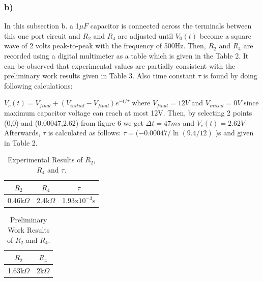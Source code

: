 \documentclass[letterpaper,12pt]{article}
\begin{document}
\subsubsection{b)}
In this subsection b. a 1\(\mu F\) capacitor is connected across the terminals between this one port circuit and \(R_2 \) and \(R_4 \) are adjusted until \(V_0(t)\) become a square wave of 2 volts peak-to-peak with the frequency of 500Hz. Then, \(R_2 \) and \(R_4 \) are recorded using a digital multimeter as a table which is given in the Table 2. It can be observed that experimental values are partially consistent with the preliminary work results given in Table 3. Also time constant \(\tau\) is found by doing following calculations:

\(V_c(t) = V_{final} + (V_{initial} - V_{final})e^{-t/\tau }\) 
where \(V_{final} = 12V\) and \(V_{initial} = 0V\) since maximum capacitor voltage can reach at most 12V.
Then, by selecting 2 points (0,0) and (0.00047,2.62) from figure 6 we get \(\Delta t = 47ms\) and \(V_c(t) = 2.62V\) 
Afterwards, \(\tau\) is calculated as follows:
\(\tau =( -0.00047/ \ln (9.4/12) \) )s  and given in Table 2.




\begin{table}[H]
    \begin{center}
        \caption{Experimental Results of \(R_2\),\(R_4\) and \(\tau \).}
        \vspace{2mm}
        \begin{tabular}{||c | c | c ||} 
            \hline
            \(R_2\) & \(R_4\) &  \(\tau \) \\ [0.5ex] 
            \hline\hline
            0.46k\(\Omega\) & 2.4k\(\Omega\) &  1.93x\(10^{-3}\)s \\
            \hline
        \end{tabular}
    \end{center}
\end{table}

\begin{table}[H]
    \begin{center}
        \caption{Preliminary Work Results of \(R_2\) and \(R_4\).}
        \vspace{2mm}
        \begin{tabular}{||c | c ||} 
            \hline
            \(R_2\) & \(R_4\) \\ [0.5ex] 
            \hline\hline
            1.63k\(\Omega\) & 2k\(\Omega\)   \\
            \hline
        \end{tabular}
    \end{center}
\end{table}
\end{document}
